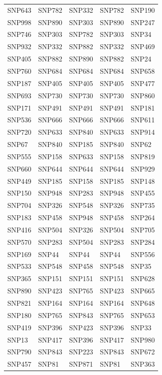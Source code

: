 \begin{table}[ht]
\begin{tabular}{lllll}
  SNP643 & SNP782 & SNP332 & SNP782 & SNP190 \\ 
  SNP998 & SNP890 & SNP303 & SNP890 & SNP247 \\ 
  SNP746 & SNP303 & SNP782 & SNP303 & SNP34 \\ 
  SNP932 & SNP332 & SNP882 & SNP332 & SNP469 \\ 
  SNP405 & SNP882 & SNP890 & SNP882 & SNP24 \\ 
  SNP760 & SNP684 & SNP684 & SNP684 & SNP658 \\ 
  SNP187 & SNP405 & SNP405 & SNP405 & SNP477 \\ 
  SNP693 & SNP730 & SNP730 & SNP730 & SNP860 \\ 
  SNP171 & SNP491 & SNP491 & SNP491 & SNP181 \\ 
  SNP536 & SNP666 & SNP666 & SNP666 & SNP611 \\ 
  SNP720 & SNP633 & SNP840 & SNP633 & SNP914 \\ 
  SNP67 & SNP840 & SNP185 & SNP840 & SNP62 \\ 
  SNP555 & SNP158 & SNP633 & SNP158 & SNP819 \\ 
  SNP660 & SNP644 & SNP644 & SNP644 & SNP929 \\ 
  SNP449 & SNP185 & SNP158 & SNP185 & SNP148 \\ 
  SNP150 & SNP948 & SNP283 & SNP948 & SNP455 \\ 
  SNP704 & SNP326 & SNP548 & SNP326 & SNP735 \\ 
  SNP183 & SNP458 & SNP948 & SNP458 & SNP264 \\ 
  SNP416 & SNP504 & SNP326 & SNP504 & SNP705 \\ 
  SNP570 & SNP283 & SNP504 & SNP283 & SNP284 \\ 
  SNP169 & SNP44 & SNP44 & SNP44 & SNP556 \\ 
  SNP533 & SNP548 & SNP458 & SNP548 & SNP35 \\ 
  SNP365 & SNP151 & SNP151 & SNP151 & SNP628 \\ 
  SNP890 & SNP423 & SNP765 & SNP423 & SNP665 \\ 
  SNP821 & SNP164 & SNP164 & SNP164 & SNP648 \\ 
  SNP180 & SNP765 & SNP843 & SNP765 & SNP653 \\ 
  SNP419 & SNP396 & SNP423 & SNP396 & SNP33 \\ 
  SNP13 & SNP417 & SNP396 & SNP417 & SNP980 \\ 
  SNP790 & SNP843 & SNP223 & SNP843 & SNP672 \\ 
  SNP457 & SNP81 & SNP871 & SNP81 & SNP363 \\ 

\end{tabular}
\end{table}
